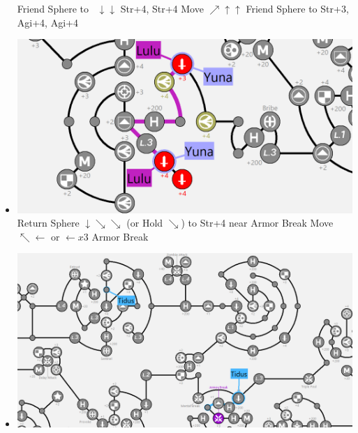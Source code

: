 \begin{spheregrid}
    \begin{itemize}
        \yunaf Friend Sphere to \lulu\ $\downarrow\downarrow$
        \yunaf Str+4, Str+4
        \luluf Move $\nearrow\uparrow\uparrow$
        \yunaf Friend Sphere to \lulu
        \yunaf Str+3, Agi+4, Agi+4
        \item \includegraphics[width=.25\columnwidth]{graphics/2_and_2}
        \tidusf Return Sphere $\downarrow\searrow\searrow$ (or Hold $\searrow$) to Str+4 near Armor Break
        \tidusf Move $\nwarrow\leftarrow$ or $\leftarrow x3$
        \tidusf Armor Break
        \item \includegraphics[width=.25\columnwidth]{graphics/Tidus armor break 2 returns}
    \end{itemize}
\end{spheregrid}

